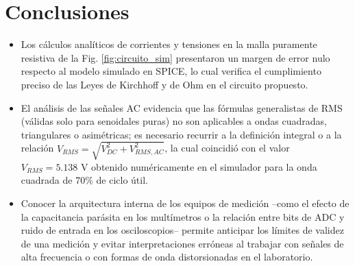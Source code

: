 \documentclass[journal, a4paper]{IEEEtran}
\begin{document}
\section{Conclusiones}
\begin{itemize}
    \item Los cálculos analíticos de corrientes y tensiones en la malla puramente resistiva de la Fig. \ref{fig:circuito_sim} presentaron un margen de error nulo respecto al modelo simulado en SPICE, lo cual verifica el cumplimiento preciso de las Leyes de Kirchhoff y de Ohm en el circuito propuesto.
    \item El análisis de las señales AC evidencia que las fórmulas generalistas de RMS (válidas solo para senoidales puras) no son aplicables a ondas cuadradas, triangulares o asimétricas; es necesario recurrir a la definición integral o a la relación $V_{RMS}=\sqrt{V_{DC}^2+V_{RMS,AC}^2}$, la cual coincidió con el valor $V_{RMS}=5.138\text{ V}$ obtenido numéricamente en el simulador para la onda cuadrada de 70\% de ciclo útil.
    \item Conocer la arquitectura interna de los equipos de medición --como el efecto de la capacitancia parásita en los multímetros o la relación entre bits de ADC y ruido de entrada en los osciloscopios-- permite anticipar los límites de validez de una medición y evitar interpretaciones erróneas al trabajar con señales de alta frecuencia o con formas de onda distorsionadas en el laboratorio.
\end{itemize}
\end{document}
